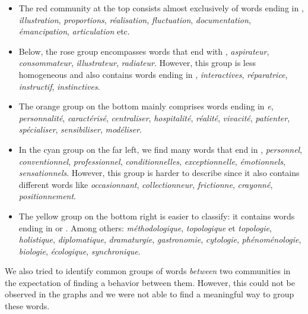 \begin{itemize}
    \item The red community at the top consists almost exclusively of words ending in , \eg \textit{illustration}, \textit{proportions}, \textit{réalisation}, \textit{fluctuation}, \textit{documentation}, \textit{émancipation}, \textit{articulation} etc.
    
    \item Below, the rose group encompasses words that end with , \eg \textit{aspirateur}, \textit{consommateur}, \textit{illustrateur}, \textit{radiateur}. However, this group is less homogeneous and also contains words ending in , \eg \textit{interactives}, \textit{réparatrice}, \textit{instructif}, \textit{instinctives}. 
    
    \item The orange group on the bottom mainly comprises words ending in \textit{e}, \eg \textit{personnalité}, \textit{caractérisé}, \textit{centraliser}, \textit{hospitalité}, \textit{réalité}, \textit{vivacité}, \textit{patienter}, \textit{spécialiser}, \textit{sensibiliser}, \textit{modéliser}.
    
    \item In the cyan group on the far left, we find many words that end in , \eg \textit{personnel}, \textit{conventionnel}, \textit{professionnel}, \textit{conditionnelles}, \textit{exceptionnelle}, \textit{émotionnels}, \textit{sensationnels}. However, this group is harder to describe since it also contains different words like \textit{occasionnant}, \textit{collectionneur}, \textit{frictionne}, \textit{crayonné}, \textit{positionnement}.
    
    \item The yellow group on the bottom right is easier to classify: it contains words ending in  or . Among others: \textit{méthodologique}, \textit{topologique} et \textit{topologie}, \textit{holistique}, \textit{diplomatique}, \textit{dramaturgie}, \textit{gastronomie}, \textit{cytologie}, \textit{phénoménologie}, \textit{biologie}, \textit{écologique}, \textit{synchronique}. 
\end{itemize}

We also tried to identify common groups of words \textit{between} two communities in the expectation of finding a  behavior between them. However, this could not be observed in the graphs and we were not able to find a meaningful way to group these words.

